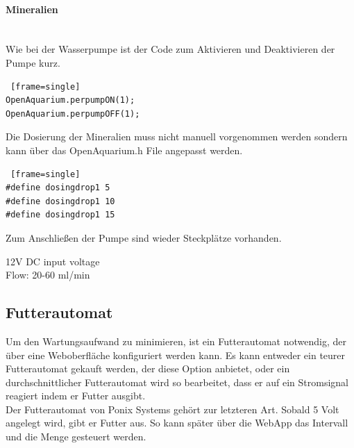 \documentclass[11pt]{article}
\begin{document}
\paragraph{Mineralien}\mbox{} \\
Wie bei der Wasserpumpe ist der Code zum Aktivieren und Deaktivieren der Pumpe kurz.
\begin{lstlisting} [frame=single]
OpenAquarium.perpumpON(1); 
OpenAquarium.perpumpOFF(1);
\end{lstlisting}
Die Dosierung der Mineralien muss nicht manuell vorgenommen werden sondern kann über das OpenAquarium.h File angepasst werden.
\begin{lstlisting} [frame=single]
#define dosingdrop1 5
#define dosingdrop1 10
#define dosingdrop1 15
\end{lstlisting}
Zum Anschließen der Pumpe sind wieder Steckplätze vorhanden. \\
\begin{minipage}{5in}
  \centering
\end{minipage} 
12V DC input voltage \\
Flow: 20-60 ml/min
\newpage

\subsection{Futterautomat}
Um den Wartungsaufwand zu minimieren, ist ein Futterautomat notwendig, der \"uber eine Weboberfl\"ache konfiguriert werden kann. Es kann entweder ein teurer Futterautomat gekauft werden, der diese Option anbietet, oder ein durchschnittlicher Futterautomat wird so bearbeitet, dass er auf ein Stromsignal reagiert indem er Futter ausgibt. \\
Der Futterautomat von Ponix Systems geh\"ort zur letzteren Art. Sobald 5 Volt angelegt wird, gibt er Futter aus. So kann sp\"ater \"uber die WebApp das Intervall und die Menge gesteuert werden.
\end{document}
